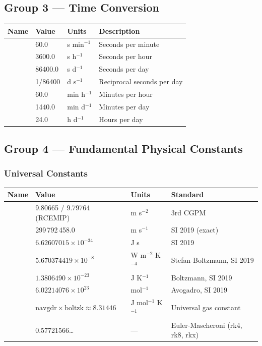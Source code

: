\subsection{Group 3 --- Time Conversion}

\begin{longtable}{L{3cm} L{3cm} L{3cm} L{5cm}}
  \toprule
  \textbf{Name} & \textbf{Value} & \textbf{Units} & \textbf{Description} \\
  \midrule
  \endhead
  \bottomrule
  \endfoot
    & 60.0     & s min$^{-1}$ & Seconds per minute \\
    & 3600.0   & s h$^{-1}$   & Seconds per hour \\
    & 86400.0  & s d$^{-1}$   & Seconds per day \\
   & 1/86400  & d s$^{-1}$   & Reciprocal seconds per day \\
    & 60.0     & min h$^{-1}$ & Minutes per hour \\
    & 1440.0   & min d$^{-1}$ & Minutes per day \\
    & 24.0     & h d$^{-1}$   & Hours per day \\
\end{longtable}

\subsection{Group 4 --- Fundamental Physical Constants}

\subsubsection{Universal Constants}

\begin{longtable}{L{3.5cm} L{4.5cm} L{2.5cm} L{3cm}}
  \toprule
  \textbf{Name} & \textbf{Value} & \textbf{Units} & \textbf{Standard} \\
  \midrule
  \endhead
  \bottomrule
  \endfoot
          & 9.80665 / 9.79764 (RCEMIP)    & m s$^{-2}$       & 3rd CGPM \\
   & 299\,792\,458.0               & m s$^{-1}$       & SI 2019 (exact) \\
  & $6.62607015\times10^{-34}$    & J s              & SI 2019 \\
           & $5.670374419\times10^{-8}$    & W m$^{-2}$ K$^{-4}$ & Stefan-Boltzmann, SI 2019 \\
         & $1.3806490\times10^{-23}$     & J K$^{-1}$       & Boltzmann, SI 2019 \\
         & $6.02214076\times10^{23}$     & mol$^{-1}$       & Avogadro, SI 2019 \\
        & $\text{navgdr}\times\text{boltzk}\approx8.31446$ & J mol$^{-1}$ K$^{-1}$ & Universal gas constant \\
       & 0.57721566\ldots               & ---              & Euler-Mascheroni (rk4, rk8, rkx) \\
\end{longtable}

